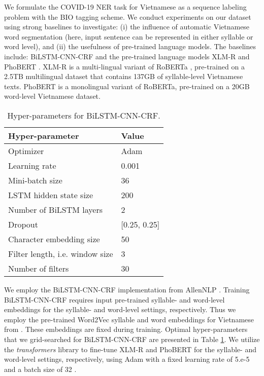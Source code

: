 \documentclass[11pt]{article}
\begin{document}
We formulate the COVID-19 NER task for Vietnamese as a sequence labeling problem with the BIO tagging scheme.  
We conduct experiments on our dataset using strong baselines to investigate: (i) the influence of automatic Vietnamese word segmentation  (here, input sentence can be represented in either syllable or word level),  and (ii) the usefulness of pre-trained language models. 
The baselines include:  {BiLSTM-CNN-CRF}  \cite{ma2016end} and the pre-trained  language models {XLM-R} \cite{conneau2019unsupervised} and {PhoBERT} \cite{nguyen2020phobert}. XLM-R  is a multi-lingual variant of RoBERTa \citep{RoBERTa}, pre-trained on a 2.5TB multilingual dataset that contains 137GB of syllable-level Vietnamese texts. PhoBERT is a monolingual variant of RoBERTa, pre-trained on a 20GB word-level Vietnamese dataset. 

\setcounter{table}{2}
\begin{table}[!t]
    \centering
    \begin{tabular}{l|l}
    \hline
        \textbf{Hyper-parameter} & \textbf{Value}  \\
        \hline
        Optimizer & Adam \\
        Learning rate & 0.001 \\
        Mini-batch size & 36 \\
        LSTM hidden state size & 200 \\
        Number of BiLSTM layers & 2 \\
        Dropout & [0.25, 0.25] \\
        \hline
        \hline
        Character embedding size & 50 \\
        Filter length, i.e. window size & 3 \\
        Number of filters & 30 \\
        \hline
    \end{tabular}
    \caption{Hyper-parameters for BiLSTM-CNN-CRF.}
    \label{tab:blstm_config}
\end{table}



We employ the BiLSTM-CNN-CRF implementation from AllenNLP \cite{Gardner2017AllenNLP}. Training BiLSTM-CNN-CRF requires input pre-trained syllable- and word-level embeddings for the syllable- and word-level settings, respectively. Thus we employ the pre-trained Word2Vec syllable and word embeddings for Vietnamese from . These embeddings are fixed during training. Optimal hyper-parameters that we grid-searched for BiLSTM-CNN-CRF are presented in Table  \ref{tab:blstm_config}. 
We utilize the \textit{transformers} library \cite{wolf-etal-2020-transformers} to fine-tune XLM-R and PhoBERT for the syllable- and word-level settings, respectively, using Adam \cite{KingmaB14} with a fixed learning rate of 5.e-5 and a batch size of 32 \cite{RoBERTa}. 
\end{document}
